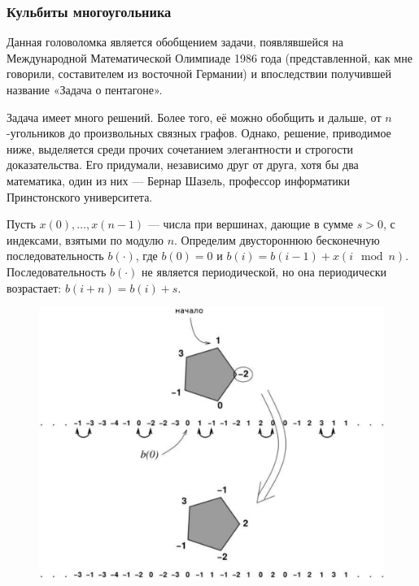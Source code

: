 \subsubsection*{Кульбиты многоугольника}%

Данная головоломка является обобщением задачи, появлявшейся на Международной Математической Олимпиаде 1986 года (представленной, как мне говорили, составителем из восточной Германии) и впоследствии получившей название «Задача о пентагоне».

Задача имеет много решений.
Более того, её можно обобщить и дальше, от $n$-угольников до произвольных связных графов.
Однако, решение, приводимое ниже, выделяется среди прочих сочетанием элегантности и строгости доказательства.
Его придумали, независимо друг от друга, хотя бы два математика, один из них --- Бернар Шазель, профессор информатики Принстонского университета. %

\medskip

Пусть $x(0),\dots,x(n-1)$ --- числа при вершинах, дающие в сумме $s > 0$, с индексами, взятыми по модулю $n$.
Определим двустороннюю бесконечную последовательность
$b(\cdot)$, где $b(0) = 0$ и $b(i) = b(i -1) + x(i \mod{n})$.
Последовательность $b(\cdot)$ не является периодической, но она периодически возрастает: $b(i + n) = b(i) + s$.

\begin{figure}
\centering
\includegraphics[scale=0.5]{Figs/Algorithms/sort}
\end{figure}

